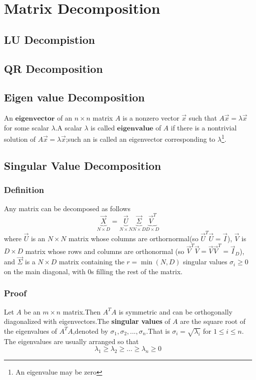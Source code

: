 \chapter{Matrix Decomposition}
\label{chapter:Matrix Decomposition}
\section{LU Decompistion}
\section{QR Decomposition}
\section{Eigen value Decomposition}
\begin{definition}
	An $\mathbf{eigenvector}$ of an $n\times n$ matrix $A$ is a nonzero vector $\vec{x}$ such that $A\vec{x}=\lambda\vec{x}$ for some scalar $\lambda$.A scalar $\lambda$ is called $\mathbf{eigenvalue}$ of $A$ if there is a nontrivial solution  of $A\vec{x}=\lambda\vec{x}$;such an  is called an eigenvector corresponding to $\lambda$\footnote{An eigenvalue may be zero}.
\end{definition}


\section{Singular Value Decomposition}

\subsection{Definition}
\begin{definition}
	Any matrix can be decomposed as follows
	\begin{equation}\label{eqn:SVD}
	\underbrace{\vec{X}}_{N \times D}=\underbrace{\vec{U}}_{N \times N}\underbrace{\vec{\Sigma}}_{N \times D}\underbrace{\vec{V}^T}_{D \times D}
	\end{equation}
	where $\vec{U}$ is an $N \times N$ matrix whose columns are orthornormal(so $\vec{U}^T\vec{U}=\vec{I}$), $\vec{V}$ is $D \times D$ matrix whose rows and columns are orthonormal (so $\vec{V}^T\vec{V}=\vec{V}\vec{V}^T=\vec{I}_D$), and $\vec{\Sigma}$ is a $N \times D$ matrix containing the $r=\min(N,D)$ singular values $\sigma_i \geq 0$ on the main diagonal, with 0s filling the rest of the matrix.
\end{definition}
\subsection{Proof}
Let $A$ be an $m\times n$ matrix.Then $A^TA$ is symmetric and can be orthogonally diagonalized with eigenvectors.The \textbf{singular values} of $A$ are the square root of the eigenvalues of $A^TA$,denoted by $\sigma_1,\sigma_2,...,\sigma_n$.That is $\sigma_i = \sqrt{\lambda_i}$ for $1\leq i \leq n$.
The eigenvalues are usually arranged so that
\begin{equation}
\lambda_1 \geq \lambda_2 \geq...\geq \lambda_n \geq 0
\end{equation}

